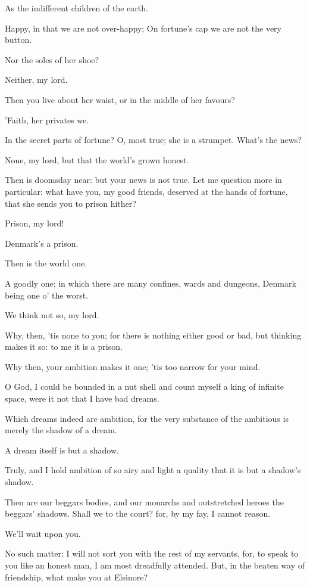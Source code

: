 \documentclass[11pt]{book}
\begin{document}
	As the indifferent children of the earth.

	Happy, in that we are not over-happy;
	On fortune's cap we are not the very button.

\1	Nor the soles of her shoe?

	Neither, my lord.

\1	Then you live about her waist, or in the middle of
	her favours?

	'Faith, her privates we.

\1	In the secret parts of fortune? O, most true; she
	is a strumpet. What's the news?

	None, my lord, but that the world's grown honest.

\1	Then is doomsday near: but your news is not true.
	Let me question more in particular: what have you,
	my good friends, deserved at the hands of fortune,
	that she sends you to prison hither?

	Prison, my lord!

\1	Denmark's a prison.

	Then is the world one.

\1	A goodly one; in which there are many confines,
	wards and dungeons, Denmark being one o' the worst.

	We think not so, my lord.

\1	Why, then, 'tis none to you; for there is nothing
	either good or bad, but thinking makes it so: to me
	it is a prison.

	Why then, your ambition makes it one; 'tis too
	narrow for your mind.

\1	O God, I could be bounded in a nut shell and count
	myself a king of infinite space, were it not that I
	have bad dreams.

	Which dreams indeed are ambition, for the very
	substance of the ambitious is merely the shadow of a dream.

\1	A dream itself is but a shadow.

	Truly, and I hold ambition of so airy and light a
	quality that it is but a shadow's shadow.

\1	Then are our beggars bodies, and our monarchs and
	outstretched heroes the beggars' shadows. Shall we
	to the court? for, by my fay, I cannot reason.


  We'll wait upon you.


\1	No such matter: I will not sort you with the rest
	of my servants, for, to speak to you like an honest
	man, I am most dreadfully attended. But, in the
	beaten way of friendship, what make you at Elsinore?
\end{document}
